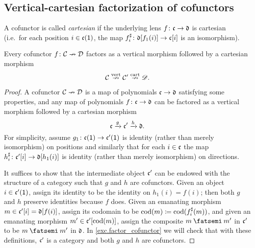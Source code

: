 \documentclass[Book-Poly]{subfiles}
\begin{document}

\subsection{Vertical-cartesian factorization of cofunctors}

A cofunctor is called \emph{cartesian} if the underlying lens $f\colon\mathfrak{c}\to\mathfrak{d}$ is cartesian (i.e.\ for each position $i\in\mathfrak{c}(\textsf{1})$, the map $f^\sharp_i\colon\mathfrak{d}[f_1(i)]\to\mathfrak{c}[i]$ is an isomorphism). %

\begin{proposition}\label{prop.factor_cofunctor}
Every cofunctor $f\colon\mathcal{C}\nrightarrow\mathcal{D}$ factors as a vertical morphism followed by a cartesian morphism
\[
\mathcal{C}\overset{\text{vert}}{\nrightarrow}\mathcal{C}'\overset{\text{cart}}{\nrightarrow}\mathscr{D}.
\]
\end{proposition}
\begin{proof}
A cofunctor $\mathcal{C}\nrightarrow\mathcal{D}$ is a map of polynomials $\mathfrak{c}\to\mathfrak{d}$ satisfying some properties, and any map of polynomials $f\colon\mathfrak{c}\to\mathfrak{d}$ can be factored as a vertical morphism followed by a cartesian morphism
\[
	\mathfrak{c}\xrightarrow{g}\mathfrak{c'}\xrightarrow{h}\mathfrak{d}.
\]
For simplicity, assume $g_1\colon\mathfrak{c}(\textsf{1})\to\mathfrak{c'}(\textsf{1})$ is identity (rather than merely isomorphism) on positions and similarly that for each $i\in\mathfrak{c}$ the map $h^\sharp_i\colon\mathfrak{c'}[i]\to\mathfrak{d}[h_1(i)]$ is identity (rather than merely isomorphism) on directions. 

It suffices to show that the intermediate object $\mathfrak{c'}$ can be endowed with the structure of a category such that $g$ and $h$ are cofunctors. Given an object $i\in\mathfrak{c'}(\textsf{1})$, assign its identity to be the identity on $h_1(i)=f(i)$; then both $g$ and $h$ preserve identities because $f$ does. Given an emanating morphism $m\in\mathfrak{c'}[i]=\mathfrak{d}[f(i)]$, assign its codomain to be $\operatorname{cod}(m)\coloneqq\operatorname{cod}(f^\sharp_i(m))$, and given an emanating morphism $m'\in\mathfrak{c'}[\operatorname{cod}(m)]$, assign the composite $m\then m'$ in $\mathfrak{c'}$ to be $m\then m'$ in $\mathfrak{d}$. In \cref{exc.factor_cofunctor} we will check that with these definitions, $\mathfrak{c'}$ is a category and both $g$ and $h$ are cofunctors.
\end{proof}
\end{document}
